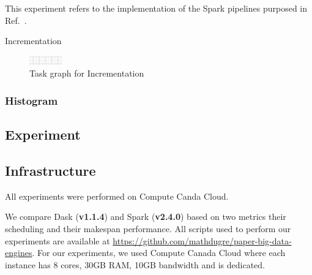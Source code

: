 \documentclass[conference]{IEEEtran}
\begin{document}
This experiment refers to the implementation of the Spark pipelines purposed
in Ref.~\cite{Hayot-Sasson:17}.

\begin{algorithm}[!t]
    \caption{Incrementation}\label{alg:incrementation}
    \begin{algorithmic}
        \EndFor
    \EndFor
\end{algorithmic}
\end{algorithm}

\begin{figure}[!t]
    \centering
    \includegraphics[width=0.125\textwidth,
    angle=-90]{images/incrementation-task-graph.png}
    \caption{Task graph for Incrementation}\label{fig:tg-inc}
\end{figure}

\subsubsection{Histogram}


\subsection{Experiment}

\subsection{Infrastructure}
All experiments were performed on Compute Canda Cloud.



We compare Dask (\textbf{v1.1.4}) and Spark (\textbf{v2.4.0}) based on two metrics
their scheduling and their makespan performance. All scripts used to perform our
experiments are available at
\href{https://github.com/mathdugre/paper-big-data-engines}{https://github.com/mathdugre/paper-big-data-engines}.
For our experiments, we used Compute Canada Cloud where each instance has 8 cores,
30GB RAM, 10GB bandwidth and is dedicated.

\end{document}
